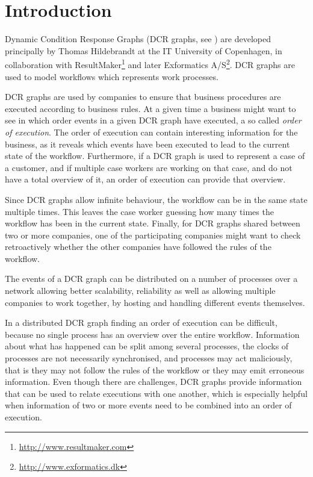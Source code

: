 \chapter{Introduction}
	Dynamic Condition Response Graphs (DCR graphs, see \cite{hildebrandt2011declarative}) are developed principally by Thomas Hildebrandt at the IT University of Copenhagen, in collaboration with ResultMaker\footnote{\url{http://www.resultmaker.com}} and later Exformatics A/S\footnote{\url{http://www.exformatics.dk}}. DCR graphs are used to model workflows which represents work processes.
	
	\newpar DCR graphs are used by companies to ensure that business procedures are executed according to business rules. At a given time a business might want to see in which order events in a given DCR graph have executed, a so called \textit{order of execution}. The order of execution can contain interesting information for the business, as it reveals which events have been executed to lead to the current state of the workflow. Furthermore, if a DCR graph is used to represent a case of a customer, and if multiple case workers are working on that case, and do not have a total overview of it, an order of execution can provide that overview.
	
	Since DCR graphs allow infinite behaviour, the workflow can be in the same state multiple times. This leaves the case worker guessing how many times the workflow has been in the current state. Finally, for DCR graphs shared between two or more companies, one of the participating companies might want to check retroactively whether the other companies have followed the rules of the workflow.
	
	\newpar The events of a DCR graph can be distributed on a number of processes over a network allowing better scalability, reliability as well as allowing multiple companies to work together, by hosting and handling different events themselves.
	
	\newpar In a distributed DCR graph finding an order of execution can be difficult, because no single process has an overview over the entire workflow. Information about what has happened can be split among several processes, the clocks of processes are not necessarily synchronised, and processes may act maliciously, that is they may not follow the rules of the workflow or they may emit erroneous information. Even though there are challenges, DCR graphs provide information that can be used to relate executions with one another, which is especially helpful when information of two or more events need to be combined into an order of execution. 
	
